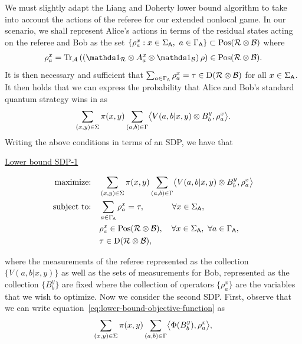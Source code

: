 We must slightly adapt the Liang and Doherty lower bound algorithm to take into account the actions of the referee for our extended nonlocal game. In our scenario, we shall represent Alice's actions in terms of the residual states acting on the referee and Bob as the set $\{ \rho_a^x : x \in \Sigma_{\mathsf{A}}, \ a \in \Gamma_{\mathsf{A}} \} \subset \mathrm{Pos}(\mathcal{R} \otimes \mathcal{B})$ where 
\begin{align}
	\rho_a^x = \tr_{\A} \left( \left( \I_{\R} \otimes A_a^x \otimes \I_{\B} \right) \rho \right) \in \Pos(\R \otimes \B).
\end{align}   
It is then necessary and sufficient that $\sum_{a \in \Gamma_{\mathsf{A}}} \rho_a^x = \tau \in \mathrm{D}(\mathcal{R} \otimes \mathcal{B})$ for all $x \in \Sigma_{\mathsf{A}}$. It then holds that we can express the probability that Alice and Bob's standard quantum strategy wins in as 
\begin{align} \label{eq:lower-bound-objective-function}
	\sum_{(x,y) \in \Sigma} \pi(x,y) \sum_{(a,b) \in \Gamma} \bigl\langle V(a,b|x,y) \otimes B_b^y, \rho_a^x \bigr\rangle.
\end{align}
Writing the above conditions in terms of an SDP, we have that 
\begin{center}
		\centerline{\underline{Lower bound SDP-1}}\vspace{-7mm}
		\begin{equation} \label{sdp:lower-bound-SDP1}		
  		\begin{split}
  			\text{maximize:}\quad & \sum_{(x,y) \in \Sigma} \pi(x,y) \sum_{(a,b) \in \Gamma} \bigl\langle V(a,b|x,y) \otimes B_b^y, \rho_a^x \bigr\rangle \\
      \text{subject to:}\quad & \sum_{a \in \Gamma_{\mathsf{A}}} \rho_a^x = \tau, \qquad \quad \ \forall x \in \Sigma_{\mathsf{A}}, \\
      & \rho_a^x \in \mathrm{Pos}(\mathcal{R} \otimes \mathcal{B}), \quad \forall x \in \Sigma_{\mathsf{A}}, \ \forall a \in \Gamma_{\mathsf{A}}, \\
      & \tau \in \mathrm{D}(\mathcal{R} \otimes \mathcal{B}),
  		\end{split}
		\end{equation}
\end{center}
where the measurements of the referee represented as the collection $\{V(a,b|x,y)\}$ as well as the sets of measurements for Bob, represented as the collection $\{B_b^y\}$ are fixed where the collection of operators $\{\rho_a^x\}$ are the variables that we wish to optimize. Now we consider the second SDP. First, observe that we can write equation~\eqref{eq:lower-bound-objective-function} as 
\begin{align}
	\sum_{(x,y) \in \Sigma} \pi(x,y) \sum_{(a,b) \in \Gamma} \bigl\langle  \Phi(B_b^y) , \rho_a^x \bigr\rangle,
\end{align}
